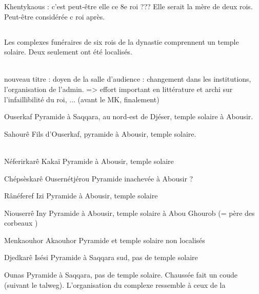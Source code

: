 Khentykaous : c'est peut-être elle ce 8e roi ???
Elle serait la mère de deux rois. Peut-être considérée c roi après.

\subsection{\texorpdfstring{}{Ve dynastie}}

Les complexes funéraires de six rois de la dynastie comprennent un 
temple solaire. Deux seulement ont été localisés.
                  
\noi{} \\
nouveau titre : doyen de la salle d'audience : changement dans les 
institutions, l'organisation de l'admin. => effort important en 
littérature et archi sur l'infaillibilité du roi, ... (avant le MK, 
finalement)

\begin{listerois}
  \item [Ouserkaf] Pyramide à Saqqara, au nord-est de Djéser, 
        temple solaire à Abousir.
  \item [Sahourê] Fils d'Ouserkaf, pyramide à Abousir, temple 
        solaire. \\
         \\
  \item [Néferirkarê Kakaï] Pyramide à Abousir, temple solaire
  \item [Chépsèskarê Ousernétjérou] Pyramide inachevée à Abousir ?
  \item [Rânéferef Izi] Pyramide à Abousir, temple solaire
  \item [Niouserrê Iny] Pyramide à Abousir, temple solaire à 
        Abou Ghourob (= \og père des corbeaux \fg)
  \item [Menkaouhor Akaouhor] Pyramide et temple solaire non localisés
  \item [Djedkarê Isési] Pyramide à Saqqara sud, pas de temple solaire
  \item [Ounas] Pyramide à Saqqara, pas de temple solaire. Chaussée 
        fait un coude (suivant le talweg). L'organisation du complexe 
        ressemble à ceux de la  \\
\end{listerois}

